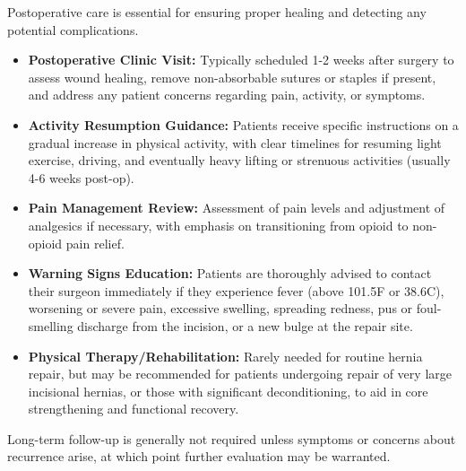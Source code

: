 Postoperative care is essential for ensuring proper healing and detecting any potential complications.

\begin{itemize}
  \item \textbf{Postoperative Clinic Visit:} Typically scheduled 1-2 weeks after surgery to assess wound healing, remove non-absorbable sutures or staples if present, and address any patient concerns regarding pain, activity, or symptoms.
  
  \item \textbf{Activity Resumption Guidance:} Patients receive specific instructions on a gradual increase in physical activity, with clear timelines for resuming light exercise, driving, and eventually heavy lifting or strenuous activities (usually 4-6 weeks post-op).
  
  \item \textbf{Pain Management Review:} Assessment of pain levels and adjustment of analgesics if necessary, with emphasis on transitioning from opioid to non-opioid pain relief.
  
  \item \textbf{Warning Signs Education:} Patients are thoroughly advised to contact their surgeon immediately if they experience fever (above 101.5\textdegree F or 38.6\textdegree C), worsening or severe pain, excessive swelling, spreading redness, pus or foul-smelling discharge from the incision, or a new bulge at the repair site.
  
  \item \textbf{Physical Therapy/Rehabilitation:} Rarely needed for routine hernia repair, but may be recommended for patients undergoing repair of very large incisional hernias, or those with significant deconditioning, to aid in core strengthening and functional recovery.
\end{itemize}

Long-term follow-up is generally not required unless symptoms or concerns about recurrence arise, at which point further evaluation may be warranted.

